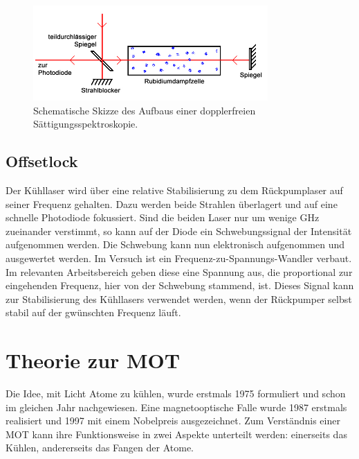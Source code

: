 \documentclass[
class=book,
accentcolor=1b,
custommargins=geometry,
fontsize=11pt,
thesis={type=Versuchsanleitung},
ruledheaders=all,
headline=false,
instbox=false,
marginpar=false,
title=small,
ignore-missing-data=true,
twoside=false,
logofile=apqdesign/tuda_logo.pdf,
pdfa=false %
]{apqpub}
\begin{document}
				\begin{figure}[htb!]
					\centering
					\includegraphics[width=0.8\textwidth]{graphics/DSS.jpg}
					\caption{Schematische Skizze des Aufbaus einer dopplerfreien Sättigungsspektroskopie.}
					\label{fig:DSS}
				\end{figure}
				
				\section{Offsetlock}\label{ssec:Offsetlock}			
				Der Kühllaser wird über eine relative Stabilisierung zu dem Rückpumplaser auf seiner Frequenz gehalten. Dazu werden beide Strahlen überlagert und auf eine schnelle Photodiode fokussiert. Sind die beiden Laser nur um wenige GHz zueinander verstimmt, so kann auf der Diode ein Schwebungssignal der Intensität aufgenommen werden. Die Schwebung kann nun elektronisch aufgenommen und ausgewertet werden.
				Im Versuch ist ein Frequenz-zu-Spannungs-Wandler verbaut. 
				Im relevanten Arbeitsbereich geben diese eine Spannung aus, die proportional zur eingehenden Frequenz, hier von der Schwebung stammend, ist. 
				Dieses Signal kann zur Stabilisierung des Kühllasers verwendet werden, wenn der Rückpumper selbst stabil auf der gwünschten Frequenz läuft.				
				
				\chapter{Theorie zur MOT}	
				Die Idee, mit Licht Atome zu kühlen, wurde erstmals 1975 formuliert und schon im gleichen Jahr nachgewiesen. \cite{pap:hansch}
				Eine magnetooptische Falle wurde 1987 erstmals realisiert und 1997 mit einem Nobelpreis ausgezeichnet. \cite{pap:nobel}
				Zum	Verständnis einer MOT kann ihre Funktionsweise in zwei Aspekte unterteilt werden: einerseits das Kühlen, andererseits das Fangen der Atome.
				
\end{document}
